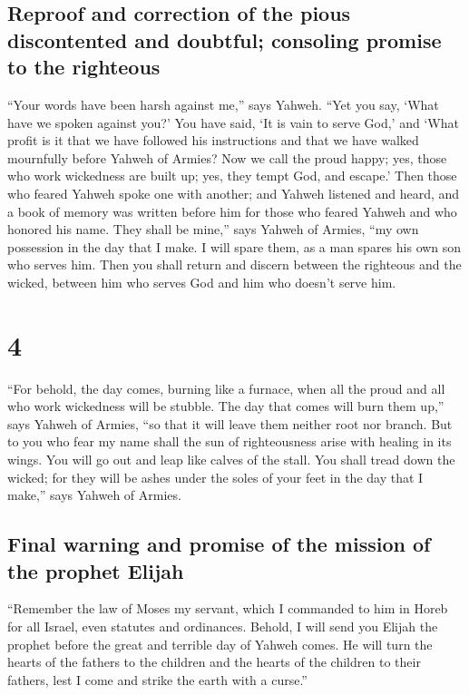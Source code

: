 \hypertarget{reproof-and-correction-of-the-pious-discontented-and-doubtful-consoling-promise-to-the-righteous}{%
\subsection{Reproof and correction of the pious discontented and
doubtful; consoling promise to the
righteous}\label{reproof-and-correction-of-the-pious-discontented-and-doubtful-consoling-promise-to-the-righteous}}

 ``Your words have been harsh against me,'' says Yahweh.
``Yet you say, `What have we spoken against you?'  You
have said, `It is vain to serve God,' and `What profit is it that we
have followed his instructions and that we have walked mournfully before
Yahweh of Armies?  Now we call the proud happy; yes,
those who work wickedness are built up; yes, they tempt God, and
escape.'  Then those who feared Yahweh spoke one with
another; and Yahweh listened and heard, and a book of memory was written
before him for those who feared Yahweh and who honored his name.
 They shall be mine,'' says Yahweh of Armies, ``my own
possession in the day that I make. I will spare them, as a man spares
his own son who serves him.  Then you shall return and
discern between the righteous and the wicked, between him who serves God
and him who doesn't serve him.

\hypertarget{section-3}{%
\section{4}\label{section-3}}

 ``For behold, the day comes, burning like a furnace, when
all the proud and all who work wickedness will be stubble. The day that
comes will burn them up,'' says Yahweh of Armies, ``so that it will
leave them neither root nor branch.  But to you who fear
my name shall the sun of righteousness arise with healing in its wings.
You will go out and leap like calves of the stall.  You
shall tread down the wicked; for they will be ashes under the soles of
your feet in the day that I make,'' says Yahweh of Armies.

\hypertarget{final-warning-and-promise-of-the-mission-of-the-prophet-elijah}{%
\subsection{Final warning and promise of the mission of the prophet
Elijah}\label{final-warning-and-promise-of-the-mission-of-the-prophet-elijah}}

 ``Remember the law of Moses my servant, which I commanded
to him in Horeb for all Israel, even statutes and ordinances.
 Behold, I will send you Elijah the prophet before the
great and terrible day of Yahweh comes.  He will turn the
hearts of the fathers to the children and the hearts of the children to
their fathers, lest I come and strike the earth with a curse.''
